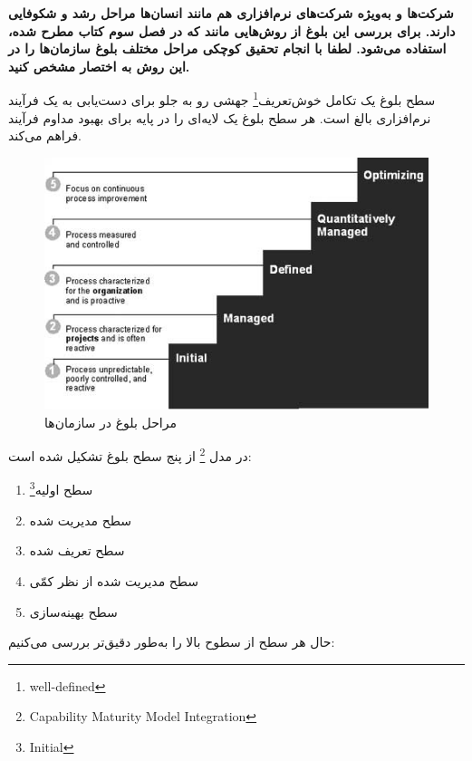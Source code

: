 

\textbf{شرکت‌ها و به‌ویژه شرکت‌های نرم‌افزاری هم مانند انسان‌ها مراحل رشد و شکوفایی دارند. برای بررسی این بلوغ از روش‌هایی مانند  که در فصل سوم کتاب مطرح شده، استفاده می‌شود. لطفا با انجام تحقیق کوچکی مراحل مختلف بلوغ سازمان‌ها را در این روش به اختصار مشخص کنید.}


سطح بلوغ یک تکامل خوش‌تعریف\footnote{well-defined} جهشی رو به جلو برای دست‌یابی به یک فرآیند نرم‌افزاری بالغ است. هر سطح بلوغ یک لایه‌ای را در پایه برای بهبود مداوم فرآیند فراهم می‌کند. 
\begin{figure}[!h]
	\begin{center}
		\includegraphics[scale=0.7]{./3.jpg}
	\end{center}
	\caption{مراحل بلوغ در سازمان‌ها}
\end{figure}

در مدل  \footnote{Capability Maturity Model Integration} از پنج سطح بلوغ تشکیل شده است:
\begin{enumerate}
	\item سطح اولیه\footnote{Initial}
	\item سطح مدیریت شده
	\item سطح تعریف شده
	\item سطح مدیریت شده از نظر کمّی
	\item سطح بهینه‌سازی
	
\end{enumerate}

حال هر سطح از سطوح بالا را به‌طور دقیق‌تر بررسی می‌کنیم:

